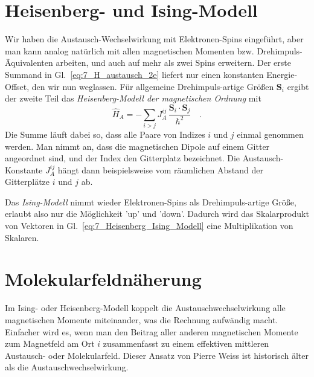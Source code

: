\section{Heisenberg- und Ising-Modell}

Wir haben die  Austausch-Wechselwirkung mit Elektronen-Spins eingeführt, aber man kann analog natürlich mit allen magnetischen Momenten bzw. Drehimpuls-Äquivalenten arbeiten, und auch auf mehr als zwei Spins erweitern. Der erste Summand in Gl.~\ref{eq:7_H_austausch_2e} liefert nur einen konstanten Energie-Offset, den wir nun weglassen.  Für allgemeine Drehimpuls-artige Größen $\bm{S}_i$ ergibt der zweite Teil das \emph{Heisenberg-Modell der magnetischen Ordnung} mit
\begin{equation}
    \hat{H}_A = - \sum_{i > j} J_A^{ij} \, \frac{\bm{S}_i \cdot \bm{S}_j}{\hbar^2}  \quad .
    \label{eq:7_Heisenberg_Ising_Modell}
\end{equation}
Die Summe läuft dabei so, dass alle Paare von Indizes $i$ und $j$ einmal genommen werden. Man nimmt an, dass die magnetischen Dipole auf einem Gitter angeordnet  sind, und der Index den Gitterplatz bezeichnet. Die Austausch-Konstante $J_A^{ij}$ hängt dann beispielsweise vom räumlichen Abstand der Gitterplätze  $i$ und $j$ ab.

Das \emph{Ising-Modell} nimmt wieder Elektronen-Spins als Drehimpuls-artige Größe, erlaubt also nur die Möglichkeit 'up' und 'down'. Dadurch wird das Skalarprodukt von Vektoren  in Gl.~\ref{eq:7_Heisenberg_Ising_Modell} eine Multiplikation von Skalaren. 


\section{Molekularfeldnäherung}


Im Ising- oder Heisenberg-Modell koppelt die Austauschwechselwirkung alle magnetischen Momente miteinander, was die Rechnung aufwändig macht. Einfacher wird es, wenn man den Beitrag aller anderen magnetischen Momente zum Magnetfeld am Ort $i$ zusammenfasst zu einem effektiven mittleren Austausch- oder Molekularfeld. Dieser Ansatz von Pierre Weiss ist historisch älter als die Austauschwechselwirkung.

